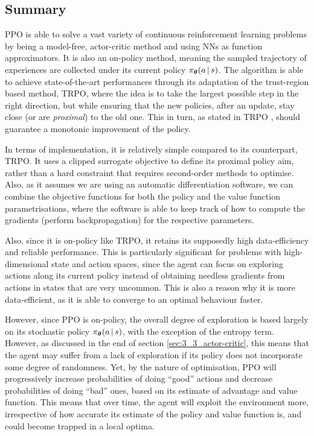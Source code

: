 \subsection{Summary}
PPO is able to solve a vast variety of continuous reinforcement learning problems by being a model-free, actor-critic method and using NNs as function approximators. It is also an on-policy method, meaning the sampled trajectory of experiences are collected under its current policy $\pi_{\boldsymbol{\theta}} (a \, | \, s)$. The algorithm is able to achieve state-of-the-art performances through its adaptation of the trust-region based method, TRPO, where the idea is to take the largest possible step in the right direction, but while ensuring that the new policies, after an update, stay close (or are \textit{proximal}) to the old one. This in turn, as stated in TRPO \cite{TRPO}, should guarantee a monotonic improvement of the policy.

In terms of implementation, it is relatively simple compared to its counterpart, TRPO. It uses a clipped surrogate objective to define its proximal policy aim, rather than a hard constraint that requires second-order methods to optimise. Also, as it assumes we are using an automatic differentiation software, we can combine the objective functions for both the policy and the value function parametrisations, where the software is able to keep track of how to compute the gradients (perform backpropagation) for the respective parameters.

Also, since it is on-policy like TRPO, it retains its supposedly high data-efficiency and reliable performance. This is particularly significant for problems with high-dimensional state and action spaces, since the agent can focus on exploring actions along its current policy instead of obtaining needless gradients from actions in states that are very uncommon. This is also a reason why it is more data-efficient, as it is able to converge to an optimal behaviour faster.

However, since PPO is on-policy, the overall degree of exploration is based largely on its stochastic policy $\pi_{\boldsymbol{\theta}} (a \, | \, s)$, with the exception of the entropy term. However, as discussed in the end of section \ref{sec:3_3_actor-critic}, this means that the agent may suffer from a lack of exploration if its policy does not incorporate some degree of randomness. Yet, by the nature of optimisation, PPO will progressively increase probabilities of doing ``good'' actions and decrease probabilities of doing ``bad'' ones, based on its estimate of advantage and value function. This means that over time, the agent will exploit the environment more, irrespective of how accurate its estimate of the policy and value function is, and could become trapped in a local optima.
